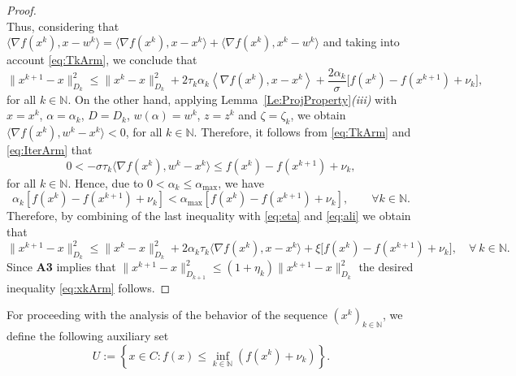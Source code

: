 \begin{proof}
$$	$$
	Thus, considering that $\big\langle \nabla f(x^k), x-w^k\big\rangle = \big\langle \nabla f(x^k), x-x^k\big\rangle + \big\langle \nabla f(x^k), x^k-w^k \big\rangle$ and taking into account \eqref{eq:TkArm}, we conclude that
	\begin{equation} \label{eq;ali}
		\|x^{k+1}-x\|_{D_k}^2 \leq  \|x^k-x\|_{D_k}^2 + 2\tau_k\alpha_k \left\langle \nabla f(x^k),x-x^k\right\rangle + \frac{2 \alpha_k}{\sigma} \big[f(x^k)-f(x^{k+1})+\nu_k\big],
	\end{equation}
	for all $ k \in \mathbb{N}$.  On the other hand, applying Lemma~\ref{Le:ProjProperty}{\it (iii)}  with $x=x^k$, $\alpha=\alpha_k$, $D = D_k$, $w(\alpha) = w^k$, $z = z^k$ and $\zeta= \zeta_k$, we obtain  $\langle \nabla f(x^k), w^k- x^k \rangle <  0$, for all  $ k \in \mathbb{N}$. Therefore, it follows from \eqref{eq:TkArm} and \eqref{eq:IterArm} that 
	$$0 < -\sigma\tau_{k} \big\langle \nabla f(x^{k}), w^{k}-x^{k} \big\rangle \leq f(x^{k}) - f(x^{k+1})+\nu_k,$$ 
	for all $k \in \mathbb{N}$. Hence, due to $0< \alpha_k\leq  \alpha_{\max}$,  we have
	$$
		\alpha_k[f(x^k)-f(x^{k+1})+\nu_k] < \alpha_{\max} [f(x^k)-f(x^{k+1})+\nu_k], \qquad \forall k \in \mathbb{N}.
	$$
	{Therefore, by combining  of the  last inequality with \eqref{eq:eta} and  \eqref{eq;ali} we obtain that
	$$
		\|x^{k+1}-x\|_{D_k}^2 \leq \|x^k-x\|_{D_k}^2 + 2\alpha_k\tau_k \big\langle \nabla f(x^k), x-x^k\big\rangle + \xi \big[f(x^k) - f(x^{k+1})+ \nu_k \big], \quad \forall ~k \in \mathbb{N}.
	$$
	Since {\bf A3}  implies that $\|x^{k+1}-x\|_{D_{k+1}}^2\leq (1+\eta_k) \|x^{k+1}-x\|_{D_k}^2$ the desired inequality \eqref{eq:xkArm} follows.}
\end{proof}

For proceeding with the analysis of  the behavior of the sequence $(x^k)_{k\in\mathbb{N}}$,  we define the following auxiliary set
\begin{equation*}\label{eq:SetTArm}
	U := \left\{x \in C: f(x) \leq \inf_{k\in {\mathbb N}}\left(f(x^{k})+\nu_k\right) \right\}.
\end{equation*}

